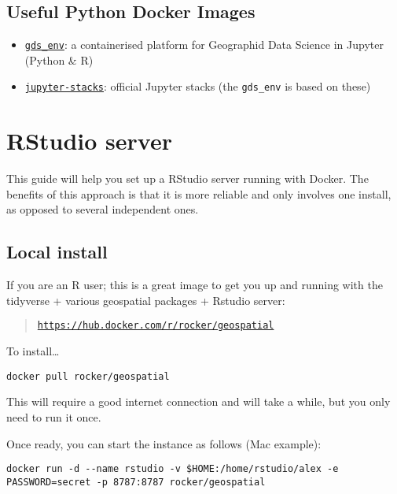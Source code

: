\documentclass[]{book}
\providecommand{\tightlist}{%
  \setlength{\itemsep}{0pt}\setlength{\parskip}{0pt}}
\begin{document}
\section{Useful Python Docker Images}\label{useful-python-docker-images}

\begin{itemize}
\tightlist
\item
  \href{https://github.com/darribas/gds_env}{\texttt{gds\_env}}: a
  containerised platform for Geographid Data Science in Jupyter (Python
  \& R)
\item
  \href{https://github.com/jupyter/docker-stacks}{\texttt{jupyter-stacks}}:
  official Jupyter stacks (the \texttt{gds\_env} is based on these)
\end{itemize}

\chapter{RStudio server}\label{rstudio-server}

This guide will help you set up a RStudio server running with Docker.
The benefits of this approach is that it is more reliable and only
involves one install, as opposed to several independent ones.

\section{Local install}\label{local-install-1}

If you are an R user; this is a great image to get you up and running
with the tidyverse + various geospatial packages + Rstudio server:

\begin{quote}
\href{https://hub.docker.com/r/rocker/geospatial}{\texttt{https://hub.docker.com/r/rocker/geospatial}}
\end{quote}

To install\ldots{}

\begin{verbatim}
docker pull rocker/geospatial
\end{verbatim}

This will require a good internet connection and will take a while, but
you only need to run it once.

Once ready, you can start the instance as follows (Mac example):

\begin{verbatim}
docker run -d --name rstudio -v $HOME:/home/rstudio/alex -e PASSWORD=secret -p 8787:8787 rocker/geospatial
\end{verbatim}
\end{document}
